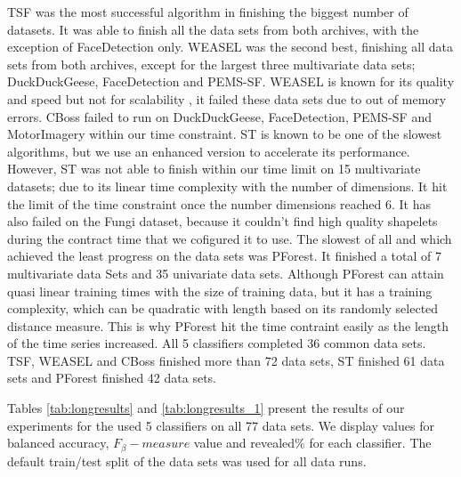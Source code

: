 TSF was the most successful algorithm in finishing the biggest number of datasets. It was able to finish all the data sets from both archives, with the exception of FaceDetection only.
WEASEL was the second best, finishing all data sets from both archives, except for the largest three multivariate data sets; DuckDuckGeese, FaceDetection and PEMS-SF.
WEASEL is known for its quality and speed but not for scalability \cite{lucas2019proximity}, it failed these data sets due to out of memory errors.
CBoss failed to run on DuckDuckGeese, FaceDetection, PEMS-SF and MotorImagery within our time constraint.
ST is known to be one of the slowest algorithms, but we use an enhanced version to accelerate its performance. However, ST was not able to finish within our time limit on 15 multivariate datasets; due to its linear time complexity with the number of dimensions. It hit the limit of the time constraint once the number dimensions reached 6.
It has also failed on the Fungi dataset, because it couldn't find high quality shapelets during the contract time that we cofigured it to use.
The slowest of all and which achieved the least progress on the data sets was PForest. It finished a total of 7 multivariate data Sets and 35 univariate data sets.
Although PForest can attain quasi linear training times with the size of training data, but it has a training complexity, which can be quadratic with length based on its randomly selected distance measure.
This is why PForest hit the time contraint easily as the length of the time series increased.
All 5 classifiers completed 36 common data sets. TSF, WEASEL and CBoss finished more than 72 data sets, ST finished 61 data sets and PForest finished 42 data sets.

Tables \ref{tab:longresults} and \ref{tab:longresults_1} present the results of our experiments for the used 5 classifiers on all 77 data sets.
We display values for balanced accuracy, $F_{\beta}-measure$ value and revealed\% for each classifier.
The default train/test split of the data sets was used for all data runs.


